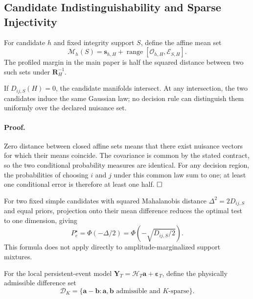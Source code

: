 \subsection{Candidate Indistinguishability and Sparse Injectivity}

For candidate $h$ and fixed integrity support $S$, define the affine mean set
\begin{equation}
 \mathcal M_h(S)=\bm s_{h,H}
 +\operatorname{range}[\mathcal O_{h,H},\mathcal E_{S,H}].
 \label{eq:supp-affine-candidate-manifold}
\end{equation}
The profiled margin in the main paper is half the squared distance between two such sets under $\bm R_H^{-1}$.

\begin{theorem}
If $D_{ij,S}(H)=0$, the candidate manifolds intersect. At any intersection, the two candidates induce the same Gaussian law; no decision rule can distinguish them uniformly over the declared nuisance set.
\label{thm:supp-candidate-indistinguishability}
\end{theorem}

\paragraph{Proof.}
Zero distance between closed affine sets means that there exist nuisance vectors for which their means coincide. The covariance is common by the stated contract, so the two conditional probability measures are identical. For any decision region, the probabilities of choosing $i$ and $j$ under this common law sum to one; at least one conditional error is therefore at least one half. $\hfill\square$

For two fixed simple candidates with squared Mahalanobis distance $\Delta^2=2D_{ij,S}$ and equal priors, projection onto their mean difference reduces the optimal test to one dimension, giving
\begin{equation}
 P_e^{\star}=\Phi(-\Delta/2)=\Phi(-\sqrt{D_{ij,S}/2}).
 \label{eq:supp-simple-gaussian-error}
\end{equation}
This formula does not apply directly to amplitude-marginalized support mixtures.

For the local persistent-event model $\bm Y_T=\mathcal H_T\bm a+\bm\varepsilon_T$, define the physically admissible difference set
\begin{equation}
 \mathcal D_K=\{\bm a-\bm b:
 \bm a,\bm b\text{ admissible and }K\text{-sparse}\}.
 \label{eq:supp-admissible-difference-set}
\end{equation}

